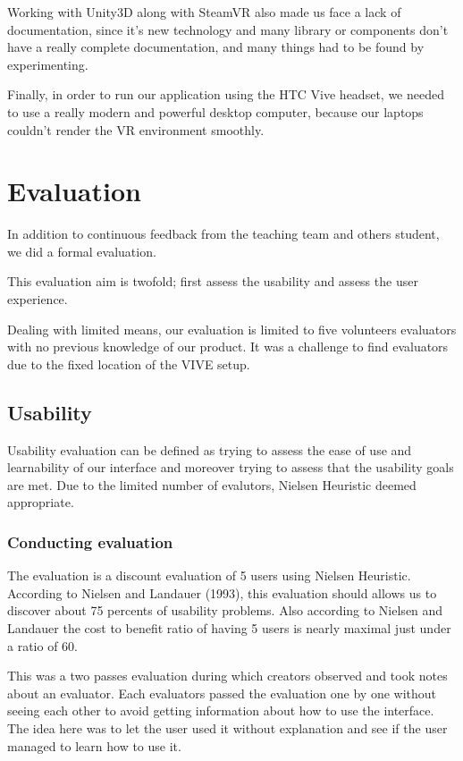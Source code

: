 \documentclass[11pt,a4paper]{article}
\begin{document}
Working with Unity3D along with SteamVR also made us face a lack of documentation, since it's new technology and many library or components don't have a really complete documentation, and many things had to be found by experimenting.

Finally, in order to run our application using the HTC Vive headset, we needed to use a really modern and powerful desktop computer, because our laptops couldn't render the VR environment smoothly.

\section{Evaluation} \label{eval}

In addition to continuous feedback from the teaching team and others student, we did a formal evaluation.

This evaluation aim is twofold; first assess the usability and assess the user experience.

Dealing with limited means, our evaluation is limited to five volunteers evaluators with no previous knowledge of our product. It was a challenge to find evaluators due to the fixed location of the VIVE setup.

\subsection{Usability}

Usability evaluation can be defined as trying to assess the ease of use and learnability of our interface and moreover trying to assess that the usability goals are met. Due to the limited number of evalutors, Nielsen Heuristic deemed appropriate.

\subsubsection{Conducting evaluation}

The evaluation is a discount evaluation of 5 users using Nielsen Heuristic. According to Nielsen and Landauer (1993), this evaluation should allows us to discover about 75 percents of usability problems. Also according to Nielsen and Landauer the cost to benefit ratio of having 5 users is nearly maximal just under a ratio of 60.

This was a two passes evaluation during which creators observed and took notes about an evaluator. Each evaluators passed the evaluation one by one without seeing each other to avoid getting information about how to use the interface. The idea here was to let the user used it without explanation and see if the user managed to learn how to use it.
\end{document}
